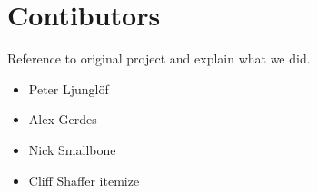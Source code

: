 \section*{Contibutors}

Reference to original project and explain what we did.

\begin{itemize}
  \item Peter Ljunglöf
  \item Alex Gerdes
  \item Nick Smallbone
  \item Cliff Shaffer
  itemize
\end{itemize}

\newpage

